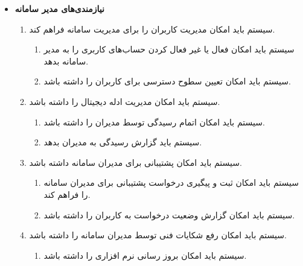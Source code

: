 \documentclass[12pt,a4paper,oneside]{article}
\begin{document}
\begin{itemize}
    \item
    \textbf{نیازمندی‌های مدیر سامانه}
    \begin{enumerate}
        \renewcommand{\labelenumi}{\textbf{.R\arabic{enumi}}}

        \item 
        سیستم باید امکان مدیریت کاربران را برای مدیریت سامانه فراهم کند.
        \begin{enumerate}
            \renewcommand{\labelenumii}{\textbf{.R\arabic{enumi}.\arabic{enumii}}}
            \item 
            سیستم باید امکان فعال یا غیر فعال کردن حساب‌های کاربری را به مدیر سامانه بدهد.
            \item 
            سیستم باید امکان تعیین سطوح دسترسی برای کاربران را داشته باشد.
        \end{enumerate}

        \item 
        سیستم باید امکان مدیریت ادله دیجیتال را داشته باشد.
        \begin{enumerate}
            \renewcommand{\labelenumii}{\textbf{.R\arabic{enumi}.\arabic{enumii}}}
            \item 
            سیستم باید امکان اتمام رسیدگی توسط مدیران را داشته باشد.
            \item 
            سیستم باید گزارش رسیدگی به مدیران بدهد.
        \end{enumerate}

        \item 
        سیستم باید امکان پشتیبانی برای مدیران سامانه داشته باشد.
        \begin{enumerate}
            \renewcommand{\labelenumii}{\textbf{.R\arabic{enumi}.\arabic{enumii}}}
            \item 
            سیستم باید امکان ثبت و پیگیری درخواست پشتیبانی برای مدیران سامانه را فراهم کند.
            \item 
            سیستم باید امکان گزارش وضعیت درخواست به کاربران را داشته باشد.
        \end{enumerate}

        \item 
        سیستم باید امکان رفع شکایات فنی توسط مدیران سامانه را داشته باشد.
        \begin{enumerate}
            \renewcommand{\labelenumii}{\textbf{.R\arabic{enumi}.\arabic{enumii}}}
            \item 
            سیستم باید امکان بروز رسانی نرم افزاری را داشته باشد.
        \end{enumerate}


\end{enumerate}
\end{itemize}
\end{document}
